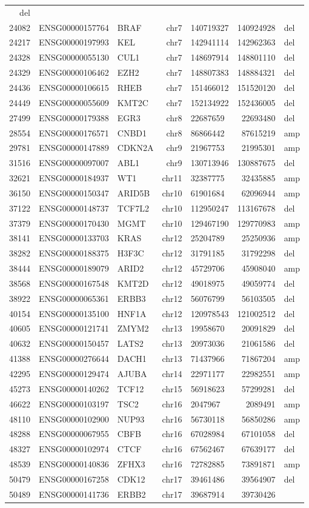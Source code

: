 \documentclass[]{article}
\begin{document}
\begin{longtable}[]{@{}rrlrlrl@{}}
del\tabularnewline
24082 & ENSG00000157764 & BRAF & chr7 & 140719327 & 140924928 &
del\tabularnewline
24217 & ENSG00000197993 & KEL & chr7 & 142941114 & 142962363 &
del\tabularnewline
24328 & ENSG00000055130 & CUL1 & chr7 & 148697914 & 148801110 &
del\tabularnewline
24329 & ENSG00000106462 & EZH2 & chr7 & 148807383 & 148884321 &
del\tabularnewline
24436 & ENSG00000106615 & RHEB & chr7 & 151466012 & 151520120 &
del\tabularnewline
24449 & ENSG00000055609 & KMT2C & chr7 & 152134922 & 152436005 &
del\tabularnewline
27499 & ENSG00000179388 & EGR3 & chr8 & 22687659 & 22693480 &
del\tabularnewline
28554 & ENSG00000176571 & CNBD1 & chr8 & 86866442 & 87615219 &
amp\tabularnewline
29781 & ENSG00000147889 & CDKN2A & chr9 & 21967753 & 21995301 &
amp\tabularnewline
31516 & ENSG00000097007 & ABL1 & chr9 & 130713946 & 130887675 &
del\tabularnewline
32621 & ENSG00000184937 & WT1 & chr11 & 32387775 & 32435885 &
amp\tabularnewline
36150 & ENSG00000150347 & ARID5B & chr10 & 61901684 & 62096944 &
amp\tabularnewline
37122 & ENSG00000148737 & TCF7L2 & chr10 & 112950247 & 113167678 &
del\tabularnewline
37379 & ENSG00000170430 & MGMT & chr10 & 129467190 & 129770983 &
amp\tabularnewline
38141 & ENSG00000133703 & KRAS & chr12 & 25204789 & 25250936 &
amp\tabularnewline
38282 & ENSG00000188375 & H3F3C & chr12 & 31791185 & 31792298 &
del\tabularnewline
38444 & ENSG00000189079 & ARID2 & chr12 & 45729706 & 45908040 &
amp\tabularnewline
38568 & ENSG00000167548 & KMT2D & chr12 & 49018975 & 49059774 &
del\tabularnewline
38922 & ENSG00000065361 & ERBB3 & chr12 & 56076799 & 56103505 &
del\tabularnewline
40154 & ENSG00000135100 & HNF1A & chr12 & 120978543 & 121002512 &
del\tabularnewline
40605 & ENSG00000121741 & ZMYM2 & chr13 & 19958670 & 20091829 &
del\tabularnewline
40632 & ENSG00000150457 & LATS2 & chr13 & 20973036 & 21061586 &
del\tabularnewline
41388 & ENSG00000276644 & DACH1 & chr13 & 71437966 & 71867204 &
amp\tabularnewline
42295 & ENSG00000129474 & AJUBA & chr14 & 22971177 & 22982551 &
amp\tabularnewline
45273 & ENSG00000140262 & TCF12 & chr15 & 56918623 & 57299281 &
del\tabularnewline
46622 & ENSG00000103197 & TSC2 & chr16 & 2047967 & 2089491 &
amp\tabularnewline
48110 & ENSG00000102900 & NUP93 & chr16 & 56730118 & 56850286 &
amp\tabularnewline
48288 & ENSG00000067955 & CBFB & chr16 & 67028984 & 67101058 &
del\tabularnewline
48327 & ENSG00000102974 & CTCF & chr16 & 67562467 & 67639177 &
del\tabularnewline
48539 & ENSG00000140836 & ZFHX3 & chr16 & 72782885 & 73891871 &
amp\tabularnewline
50479 & ENSG00000167258 & CDK12 & chr17 & 39461486 & 39564907 &
del\tabularnewline
50489 & ENSG00000141736 & ERBB2 & chr17 & 39687914 & 39730426 &

\end{longtable}
\end{document}
